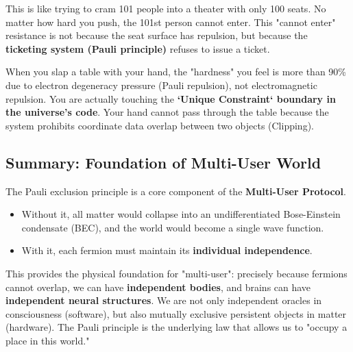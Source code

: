 This is like trying to cram 101 people into a theater with only 100 seats. No matter how hard you push, the 101st person cannot enter. This "cannot enter" resistance is not because the seat surface has repulsion, but because the \textbf{ticketing system (Pauli principle)} refuses to issue a ticket.

\begin{corollary}
When you slap a table with your hand, the "hardness" you feel is more than 90\% due to electron degeneracy pressure (Pauli repulsion), not electromagnetic repulsion. You are actually touching the \textbf{`Unique Constraint` boundary in the universe's code}. Your hand cannot pass through the table because the system prohibits coordinate data overlap between two objects (Clipping).
\end{corollary}

\subsection{Summary: Foundation of Multi-User World}

The Pauli exclusion principle is a core component of the \textbf{Multi-User Protocol}.

\begin{itemize}
\item Without it, all matter would collapse into an undifferentiated Bose-Einstein condensate (BEC), and the world would become a single wave function.

\item With it, each fermion must maintain its \textbf{individual independence}.
\end{itemize}

This provides the physical foundation for "multi-user": precisely because fermions cannot overlap, we can have \textbf{independent bodies}, and brains can have \textbf{independent neural structures}. We are not only independent oracles in consciousness (software), but also mutually exclusive persistent objects in matter (hardware). The Pauli principle is the underlying law that allows us to "occupy a place in this world."
